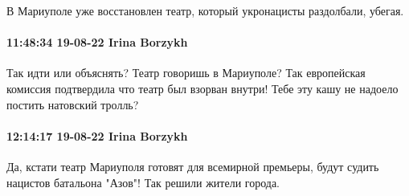 В Мариуполе уже восстановлен театр, который укронацисты раздолбали, убегая.

\paragraph{11:48:34 19-08-22 Irina Borzykh}

Так идти или объяснять? Театр говоришь в Мариуполе? Так европейская комиссия
подтвердила что театр был взорван внутри! Тебе эту кашу не надоело постить
натовский тролль?

\paragraph{12:14:17 19-08-22 Irina Borzykh}

Да, кстати театр Мариуполя готовят для всемирной премьеры, будут судить
нацистов батальона "Азов"! Так решили жители города.
